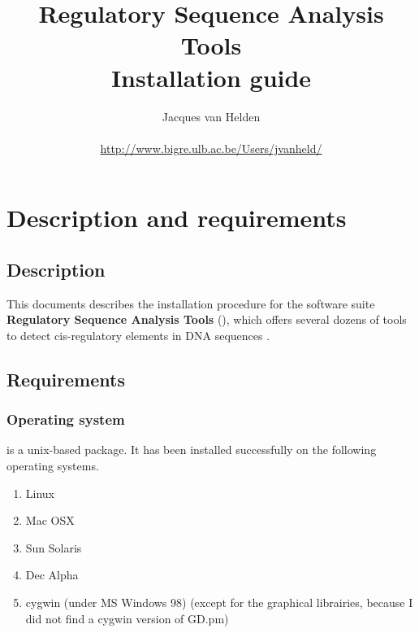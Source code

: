 \documentclass{book}
\begin{document}
\title{Regulatory Sequence Analysis Tools \\
Installation guide}

\author{
	Jacques van Helden \\
	 \\
	\url{http://www.bigre.ulb.ac.be/Users/jvanheld/} \\
	\bigre
}


\maketitle

\newpage
\tableofcontents
\newpage

\chapter{Description and requirements}

\section{Description}

This documents describes the installation procedure for the software
suite \textbf{Regulatory Sequence Analysis Tools} (\RSAT), which
offers several dozens of tools to detect cis-regulatory elements in
DNA sequences
\cite{Thomas-Chollier:2008:W119-27,vanHelden:2003:3593-6,vanHelden:2000:177-87}.

\section{Requirements}

\subsection{Operating system}

\RSAT is a unix-based package. It has been installed successfully on
the following operating systems.

\begin{enumerate}
\item Linux

\item Mac OSX

\item Sun Solaris

\item Dec Alpha

\item cygwin (under MS Windows 98) (except for the graphical
librairies, because I did not find a cygwin version of GD.pm)

\end{enumerate}
\end{document}
